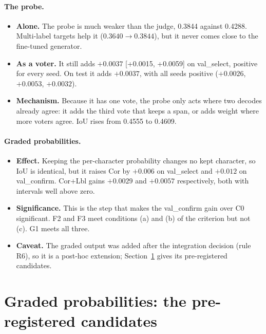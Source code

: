 \paragraph{The probe.}
\begin{itemize}
    \item \textbf{Alone.} The probe is much weaker than the judge, 0.3844 against 0.4288. Multi-label targets help it ($0.3640 \to 0.3844$), but it never comes close to the fine-tuned generator.
    \item \textbf{As a voter.} It still adds $+0.0037$ [+0.0015, +0.0059] on val\_select, positive for every seed. On test it adds $+0.0037$, with all seeds positive ($+0.0026$, $+0.0053$, $+0.0032$).
    \item \textbf{Mechanism.} Because it has one vote, the probe only acts where two decodes already agree: it adds the third vote that keeps a span, or adds weight where more voters agree. IoU rises from 0.4555 to 0.4609.
\end{itemize}

\paragraph{Graded probabilities.}
\begin{itemize}
    \item \textbf{Effect.} Keeping the per-character probability changes no kept character, so IoU is identical, but it raises Cor by $+0.006$ on val\_select and $+0.012$ on val\_confirm. Cor+Lbl gains $+0.0029$ and $+0.0057$ respectively, both with intervals well above zero.
    \item \textbf{Significance.} This is the step that makes the val\_confirm gain over C0 significant. F2 and F3 meet conditions (a) and (b) of the criterion but not (c). G1 meets all three.
    \item \textbf{Caveat.} The graded output was added after the integration decision (rule R6), so it is a post-hoc extension; Section~\ref{sec:exp-graded} gives its pre-registered candidates.
\end{itemize}

\section{Graded probabilities: the pre-registered candidates}\label{sec:exp-graded}

